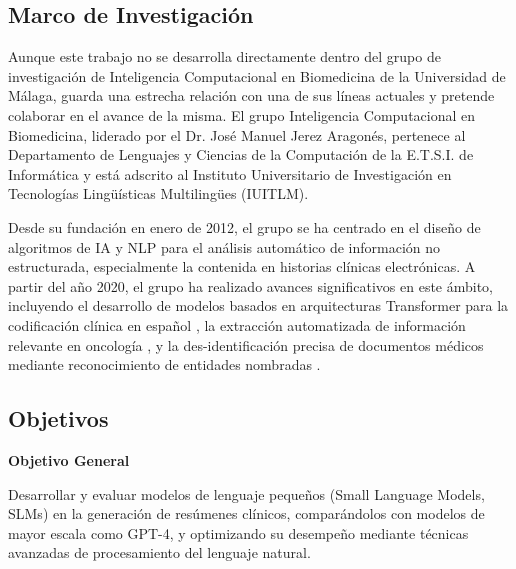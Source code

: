 \documentclass[../main.tex]{subfiles}
\begin{document}
\subsection{Marco de Investigación}

Aunque este trabajo no se desarrolla directamente dentro del grupo de investigación de Inteligencia Computacional en Biomedicina de la Universidad de Málaga, guarda una estrecha relación con una de sus líneas actuales y pretende colaborar en el avance de la misma. El grupo Inteligencia Computacional en Biomedicina, liderado por el Dr. José Manuel Jerez Aragonés, pertenece al Departamento de Lenguajes y Ciencias de la Computación de la E.T.S.I. de Informática y está adscrito al Instituto Universitario de Investigación en Tecnologías Lingüísticas Multilingües (IUITLM).

Desde su fundación en enero de 2012, el grupo se ha centrado en el diseño de algoritmos de IA y NLP para el análisis automático de información no estructurada, especialmente la contenida en historias clínicas electrónicas. A partir del año 2020, el grupo ha realizado avances significativos en este ámbito, incluyendo el desarrollo de modelos basados en arquitecturas Transformer para la codificación clínica en español \parencite{transformers_clinical_coding}, la extracción automatizada de información relevante en oncología \parencite{clinical_text_classification_cancer}, y la des-identificación precisa de documentos médicos mediante reconocimiento de entidades nombradas \parencite{ner_deidentification_ehr}. 



\subsection{Objetivos}
\textbf{Objetivo General}  

Desarrollar y evaluar modelos de lenguaje pequeños (Small Language Models, SLMs) en la generación de resúmenes clínicos,
comparándolos con modelos de mayor escala como GPT-4, y optimizando su desempeño mediante técnicas avanzadas de
procesamiento del lenguaje natural.
\end{document}
